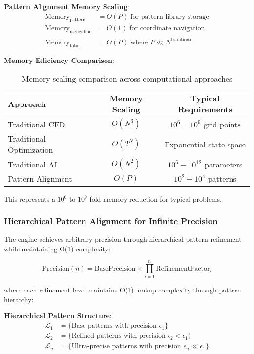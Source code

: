 \documentclass[11pt,a4paper]{article}
\theoremstyle{remark}
\begin{document}
\textbf{Pattern Alignment Memory Scaling}:
\begin{align}
\text{Memory}_{\text{pattern}} &= O(P) \text{ for pattern library storage} \\
\text{Memory}_{\text{navigation}} &= O(1) \text{ for coordinate navigation} \\
\text{Memory}_{\text{total}} &= O(P) \text{ where } P \ll N^{\text{traditional}}
\end{align}

\textbf{Memory Efficiency Comparison}:
\begin{table}[H]
\centering
\begin{tabular}{lcc}
\toprule
Approach & Memory Scaling & Typical Requirements \\
\midrule
Traditional CFD & $O(N^3)$ & $10^6 - 10^9$ grid points \\
Traditional Optimization & $O(2^N)$ & Exponential state space \\
Traditional AI & $O(N^2)$ & $10^6 - 10^{12}$ parameters \\
Pattern Alignment & $O(P)$ & $10^2 - 10^4$ patterns \\
\bottomrule
\end{tabular}
\caption{Memory scaling comparison across computational approaches}
\end{table}

This represents a $10^6$ to $10^9$ fold memory reduction for typical problems.

\subsubsection{Hierarchical Pattern Alignment for Infinite Precision}

The engine achieves arbitrary precision through hierarchical pattern refinement while maintaining O(1) complexity:

\begin{equation}
\text{Precision}(n) = \text{BasePrecision} \times \prod_{i=1}^{n} \text{RefinementFactor}_i
\end{equation}

where each refinement level maintains O(1) lookup complexity through pattern hierarchy:

\textbf{Hierarchical Pattern Structure}:
\begin{align}
\mathcal{L}_1 &= \{\text{Base patterns with precision } \epsilon_1\} \\
\mathcal{L}_2 &= \{\text{Refined patterns with precision } \epsilon_2 < \epsilon_1\} \\
\mathcal{L}_n &= \{\text{Ultra-precise patterns with precision } \epsilon_n \ll \epsilon_1\}
\end{align}
\end{document}

